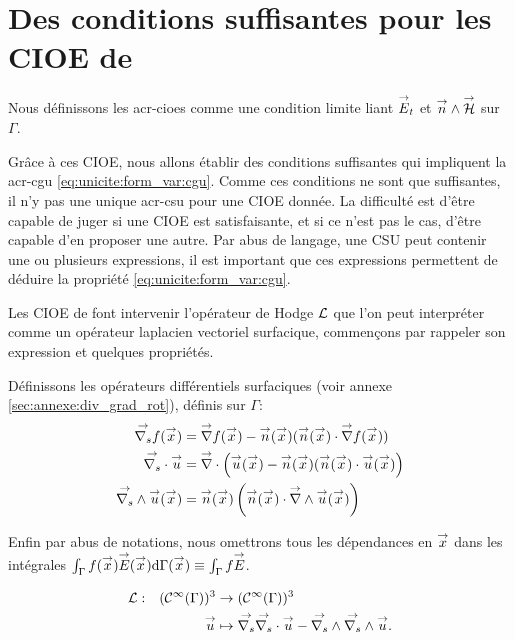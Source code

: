 \section[Des CSU pour les CIOE de Stupfel et Poget 2011]{Des conditions suffisantes pour les CIOE de \cite{stupfel_sufficient_2011}}

  Nous définissons les \glspl{acr-cioe} comme une condition limite liant \(\vE_t\) et \(\vn\pvect\vH\) sur \(\Gamma\).

  Grâce à ces CIOE, nous allons établir des conditions suffisantes qui impliquent la \gls{acr-cgu} \eqref{eq:unicite:form_var:cgu}. Comme ces conditions ne sont que suffisantes, il n'y pas une unique \gls{acr-csu} pour une CIOE donnée. La difficulté est d'être capable de juger si une CIOE est satisfaisante, et si ce n'est pas le cas, d'être capable d'en proposer une autre. Par abus de langage, une CSU peut contenir une ou plusieurs expressions, il est important que ces expressions permettent de déduire la propriété \eqref{eq:unicite:form_var:cgu}.

  Les CIOE de \cite{stupfel_sufficient_2011} font intervenir l'opérateur de Hodge \(\LL\) que l'on peut interpréter comme un opérateur laplacien vectoriel surfacique, commençons par rappeler son expression et quelques propriétés.

  Définissons les opérateurs différentiels surfaciques (voir annexe \ref{sec:annexe:div_grad_rot}), définis sur \(\Gamma\):
  \begin{align*}
      \vgrads{f}(\vx) &= \vgrad{f}(\vx) - \vn(\vx) (\vn(\vx) \cdot \vgrad{f}(\vx))
      \\
      \vdivs{\vu} &= \vdiv\left(\vu(\vx) - \vn(\vx) (\vn(\vx) \cdot \vu(\vx)\right)
      \\
      \vrots{\vu}(\vx) &= \vn(\vx)\left(\vn(\vx) \cdot \vrot{\vu}(\vx)\right)
  \end{align*}


  Enfin par abus de notations, nous omettrons tous les dépendances en \(\vx\) dans les intégrales \(\int_\Gamma f(\vx)\vE(\vx)\dd{\Gamma(\vx)}\equiv \int_\Gamma f\vE\).
  \begin{defn}
    \label{def:operator:L}
    \begin{equation*}
        \fonction{\LL}{(\mathcal{C}^\infty(\Gamma))^3}{(\mathcal{C}^\infty(\Gamma))^3}
          {\vu}{\vgrads{\vdivs \vu} - \vrots{\vrots \vu}.}
    \end{equation*}
  \end{defn}

